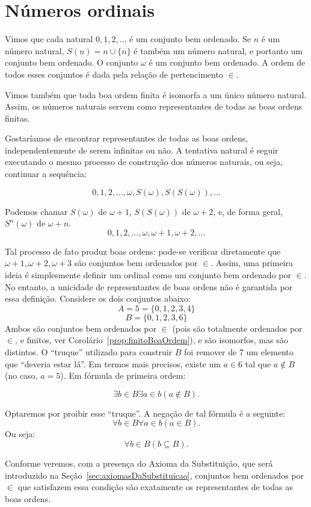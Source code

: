 \section{Números ordinais}\label{sec:numerosOrdinais}
Vimos que cada natural $0, 1, 2, \dots$ é um conjunto bem ordenado.
Se $n$ é um número natural, $S(n) = n\cup\{n\}$ é também um número natural, e portanto um conjunto bem ordenado.
O conjunto $\omega$ é um conjunto bem ordenado.
A ordem de todos esses conjuntos é dada pela relação de pertencimento $\in$.

Vimos também que toda boa ordem finita é isomorfa a um único número natural.
Assim, os números naturais servem como representantes de todas as boas ordens finitas.

Gostaríamos de encontrar representantes de todas as boas ordens, independentemente de serem infinitas ou não.
A tentativa natural é seguir executando o mesmo processo de construção dos números naturais, ou seja, continuar a sequência:

\[
0, 1, 2, \dots, \omega, S(\omega), S(S(\omega)), \dots
\]

Podemos chamar $S(\omega)$ de $\omega+1$, $S(S(\omega))$ de $\omega+2$, e, de forma geral, $S^n(\omega)$ de $\omega+n$.
\[
0, 1, 2, \dots, \omega, \omega+1, \omega+2, \dots
\]

Tal processo de fato produz boas ordens: pode-se verificar diretamente que $\omega+1, \omega+2, \omega+3$ são conjuntos bem ordenados por $\in$.
Assim, uma primeira ideia é simplesmente definir um ordinal como um conjunto bem ordenado por $\in$.
No entanto, a unicidade de representantes de boas ordens não é garantida por essa definição.
Considere os dois conjuntos abaixo:
\[
    A=5=\{0, 1, 2, 3, 4\}
\]
\[
    B=\{0, 1, 2, 3, 6\}
\]
Ambos são conjuntos bem ordenados por $\in$ (pois são totalmente ordenados por $\in$, e finitos, ver Corolário~\ref{prop:finitoBoaOrdem}), e são isomorfos, mas são distintos.
O ``truque'' utilizado para construir $B$ foi remover de $7$ um elemento que ``deveria estar lá''.
Em termos mais precisos, existe um $a \in 6$ tal que $a \notin B$ (no caso, $a=5$).
Em fórmula de primeira ordem:

\[
    \exists b\in B \exists a\in b (a\notin B).
\]

Optaremos por proibir esse ``truque''.
A negação de tal fórmula é a seguinte:
\[
    \forall b\in B \forall a\in b (a\in B).
\]
Ou seja:
\[
    \forall b\in B (b\subseteq B).
\]

Conforme veremos, com a presença do Axioma da Substituição, que será introduzido na Seção~\ref{sec:axiomasDaSubstituicao}, conjuntos bem ordenados por $\in$ que satisfazem essa condição são exatamente os representantes de todas as boas ordens.

